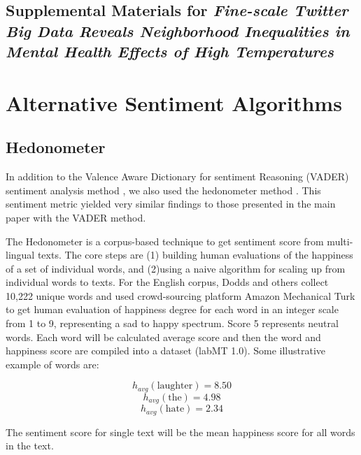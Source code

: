 \documentclass{article}
\begin{document}
\begin{center}
\section*{Supplemental Materials for \textit{Fine-scale Twitter Big Data Reveals Neighborhood Inequalities in Mental Health Effects of High Temperatures}}
\end{center}

\setcounter{table}{0}
\setcounter{figure}{0}
\setcounter{section}{0}
\renewcommand{\thetable}{S\arabic{table}}
\renewcommand{\thefigure}{S\arabic{figure}}
\renewcommand{\thesection}{S\arabic{section}}

\section{Alternative Sentiment Algorithms}

\subsection{Hedonometer}

In addition to the Valence Aware Dictionary for sentiment Reasoning (VADER) sentiment analysis method \cite{gilbert_vader_2014}, we also used the hedonometer method \cite{Dodds2011Dec}.  This sentiment metric yielded very similar findings to those presented in the main paper with the VADER method.

The Hedonometer \cite{dodds_temporal_2011} is a corpus-based technique to get sentiment score from multi-lingual texts. The core steps are (1) building human evaluations of the happiness of a set of individual words, and (2)using a naive algorithm for scaling up from individual words to texts. For the English corpus, Dodds and others \cite{dodds_temporal_2011} collect 10,222 unique words and used crowd-sourcing platform Amazon Mechanical Turk to get human evaluation of happiness degree for each word in an integer scale from 1 to 9, representing a sad to happy spectrum. Score 5 represents neutral words. Each word will be calculated average score and then the word and happiness score are compiled into a dataset (labMT 1.0). Some illustrative example of words are: 

\[h_{avg} (\text{laughter}) = 8.50 \]
\[h_{avg} (\text{the}) = 4.98\]
\[h_{avg} (\text{hate}) = 2.34\]

The sentiment score for single text will be the mean happiness score for all words in the text.
\end{document}
